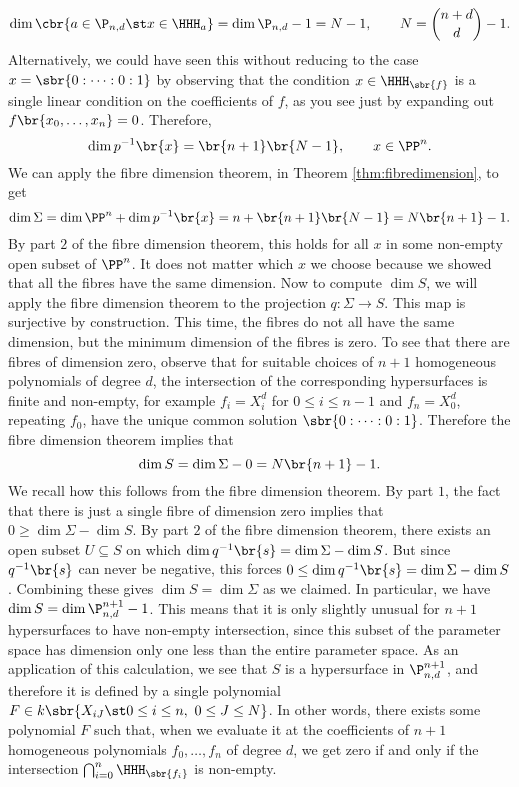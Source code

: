 \begin{example*}
$$ \dim \cbr{a \in \P_{n, d} \st x \in \HHH_a} = \dim \P_{n, d} - 1 = N - 1, \qquad N = \binom{n + d}{d} - 1. $$
Alternatively, we could have seen this without reducing to the case $ x = \sbr{0 : \dots : 0 : 1} $ by observing that the condition $ x \in \HHH_{\sbr{f}} $ is a single linear condition on the coefficients of $ f $, as you see just by expanding out $ f\br{x_0, \dots, x_n} = 0 $. Therefore,
$$ \dim p^{-1}\br{x} = \br{n + 1}\br{N - 1}, \qquad x \in \PP^n. $$
We can apply the fibre dimension theorem, in Theorem \ref{thm:fibredimension}, to get
$$ \dim \Sigma = \dim \PP^n + \dim p^{-1}\br{x} = n + \br{n + 1}\br{N - 1} = N\br{n + 1} - 1. $$
By part $ 2 $ of the fibre dimension theorem, this holds for all $ x $ in some non-empty open subset of $ \PP^n $. It does not matter which $ x $ we choose because we showed that all the fibres have the same dimension. Now to compute $ \dim S $, we will apply the fibre dimension theorem to the projection $ q : \Sigma \to S $. This map is surjective by construction. This time, the fibres do not all have the same dimension, but the minimum dimension of the fibres is zero. To see that there are fibres of dimension zero, observe that for suitable choices of $ n + 1 $ homogeneous polynomials of degree $ d $, the intersection of the corresponding hypersurfaces is finite and non-empty, for example $ f_i = X_i^d $ for $ 0 \le i \le n - 1 $ and $ f_n = X_0^d $, repeating $ f_0 $, have the unique common solution $ \sbr{0 : \dots : 0 : 1} $. Therefore the fibre dimension theorem implies that
$$ \dim S = \dim \Sigma - 0 = N\br{n + 1} - 1. $$
We recall how this follows from the fibre dimension theorem. By part $ 1 $, the fact that there is just a single fibre of dimension zero implies that $ 0 \ge \dim \Sigma - \dim S $. By part $ 2 $ of the fibre dimension theorem, there exists an open subset $ U \subseteq S $ on which $ \dim q^{-1}\br{s} = \dim \Sigma - \dim S $. But since $ q^{-1}\br{s} $ can never be negative, this forces $ 0 \le \dim q^{-1}\br{s} = \dim \Sigma - \dim S $. Combining these gives $ \dim S = \dim \Sigma $ as we claimed. In particular, we have $ \dim S = \dim \P_{n, d}^{n + 1} - 1 $. This means that it is only slightly unusual for $ n + 1 $ hypersurfaces to have non-empty intersection, since this subset of the parameter space has dimension only one less than the entire parameter space. As an application of this calculation, we see that $ S $ is a hypersurface in $ \P_{n, d}^{n + 1} $, and therefore it is defined by a single polynomial $ F \in k\sbr{X_{iJ} \st 0 \le i \le n, \ 0 \le J \le N} $. In other words, there exists some polynomial $ F $ such that, when we evaluate it at the coefficients of $ n + 1 $ homogeneous polynomials $ f_0, \dots, f_n $ of degree $ d $, we get zero if and only if the intersection $ \bigcap_{i = 0}^n \HHH_{\sbr{f_i}} $ is non-empty.
\end{example*}

